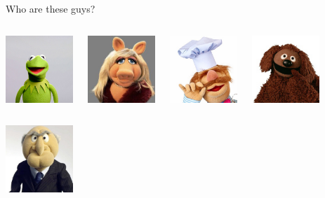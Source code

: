 \documentclass{beamer}\usepackage[]{graphicx}\usepackage[]{color}
\begin{document}
\begin{darkframes}
\begin{frame}{Who are these guys?}
  \begin{columns}[onlytextwidth]
      \begin{center}
        \includegraphics[width=1in]{kermitthefrog} \\
      \end{center}
      \begin{center}
        \includegraphics[width=1in]{misspiggy} \\
      \end{center}
      \begin{center}
        \includegraphics[width=1in]{swedishchef} \\
      \end{center}
      \begin{center}
        \includegraphics[width=1in]{rowlf} \\
      \end{center}
  \end{columns}
  \smallskip
  \begin{columns}[onlytextwidth]
      \begin{center}
        \includegraphics[width=1in]{statler} \\

\end{center}
\end{columns}
\end{frame}
\end{darkframes}
\end{document}
